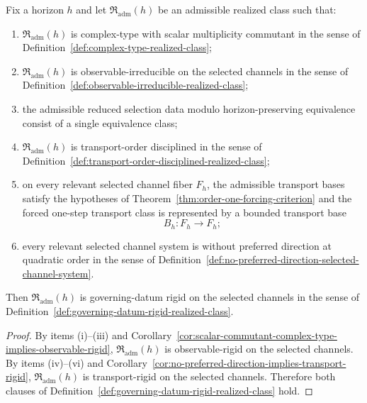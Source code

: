 \begin{corollary}
\label{cor:intrinsic-package-implies-governing-datum-rigid}
Fix a horizon $h$ and let $\mathfrak R_{\mathrm{adm}}(h)$ be an admissible
realized class such that:
\begin{enumerate}[label=(\roman*), leftmargin=2em, itemsep=0.2em]
\item $\mathfrak R_{\mathrm{adm}}(h)$ is complex-type with scalar multiplicity
      commutant in the sense of
      Definition~\ref{def:complex-type-realized-class};
\item $\mathfrak R_{\mathrm{adm}}(h)$ is observable-irreducible on the
      selected channels in the sense of
      Definition~\ref{def:observable-irreducible-realized-class};
\item the admissible reduced selection data modulo horizon-preserving
      equivalence consist of a single equivalence class;
\item $\mathfrak R_{\mathrm{adm}}(h)$ is transport-order disciplined in the
      sense of
      Definition~\ref{def:transport-order-disciplined-realized-class};
\item on every relevant selected channel fiber $F_h$, the admissible transport
      bases satisfy the hypotheses of
      Theorem~\ref{thm:order-one-forcing-criterion} and the forced one-step
      transport class is represented by a bounded transport base
      \[
      B_h:F_h\to F_h;
      \]
\item every relevant selected channel system is without preferred direction at
      quadratic order in the sense of
      Definition~\ref{def:no-preferred-direction-selected-channel-system}.
\end{enumerate}
Then $\mathfrak R_{\mathrm{adm}}(h)$ is governing-datum rigid on the selected
channels in the sense of
Definition~\ref{def:governing-datum-rigid-realized-class}.
\end{corollary}

\begin{proof}
By items (i)--(iii) and
Corollary~\ref{cor:scalar-commutant-complex-type-implies-observable-rigid},
$\mathfrak R_{\mathrm{adm}}(h)$ is observable-rigid on the selected channels.
By items (iv)--(vi) and
Corollary~\ref{cor:no-preferred-direction-implies-transport-rigid},
$\mathfrak R_{\mathrm{adm}}(h)$ is transport-rigid on the selected channels.
Therefore both clauses of
Definition~\ref{def:governing-datum-rigid-realized-class} hold.
\end{proof}

